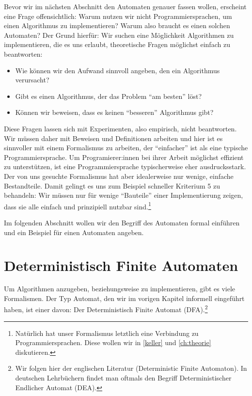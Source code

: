 Bevor wir im nächsten Abschnitt den Automaten genauer fassen wollen,
erscheint eine Frage offensichtlich:
Warum nutzen wir nicht Programmiersprachen, um einen Algorithmus zu implementieren?
Warum also braucht es einen solchen Automaten?
Der Grund hierfür:
Wir suchen eine Möglichkeit Algorithmen zu implementieren,
die es uns erlaubt,
theoretische Fragen möglichst einfach zu beantworten:
\begin{itemize}
    \item Wie können wir den Aufwand sinnvoll angeben, den ein Algorithmus verursacht?
    \item Gibt es einen Algorithmus, der das Problem ``am besten'' löst?
    \item Können wir beweisen, dass es keinen ``besseren'' Algorithmus gibt?
\end{itemize}
Diese Fragen lassen sich mit Experimenten, also empirisch, nicht beantworten.
Wir müssen daher mit Beweisen und Definitionen arbeiten
und hier ist es sinnvoller mit einem Formalismus zu arbeiten,
der ``einfacher'' ist als eine typische Programmiersprache.
Um Programierer:innen bei ihrer Arbeit möglichst effizient zu unterstützen,
ist eine Programmiersprache typischerweise eher ausdrucksstark.
Der von uns gesuchte Formalismus hat aber idealerweise nur wenige, einfache Bestandteile.
Damit gelingt es uns zum Beispiel schneller Kriterium 5 zu behandeln:
Wir müssen nur für wenige ``Bauteile'' einer Implementierung zeigen,
dass sie alle einfach und prinzipiell nutzbar sind.\footnote{
    Natürlich hat unser Formalismus letztlich eine Verbindung zu Programmiersprachen.
    Diese wollen wir in \autoref{keller} und \autoref{ch:theorie} diskutieren.
}

Im folgenden Abschnitt wollen wir den Begriff des Automaten formal einführen
und ein Beispiel für einen Automaten angeben. 

\section{Deterministisch Finite Automaten}

Um Algorithmen anzugeben, beziehungsweise zu implementieren, gibt es viele Formalismen.
Der Typ Automat, den wir im vorigen Kapitel informell eingeführt haben,
ist einer davon:
Der Deterministisch Finite Automat (DFA).\footnote{
    Wir folgen hier der englischen Literatur (Deterministic Finite Automaton).
    In deutschen Lehrbüchern findet man oftmals den Begriff
    Deterministischer Endlicher Automat (DEA).
}

